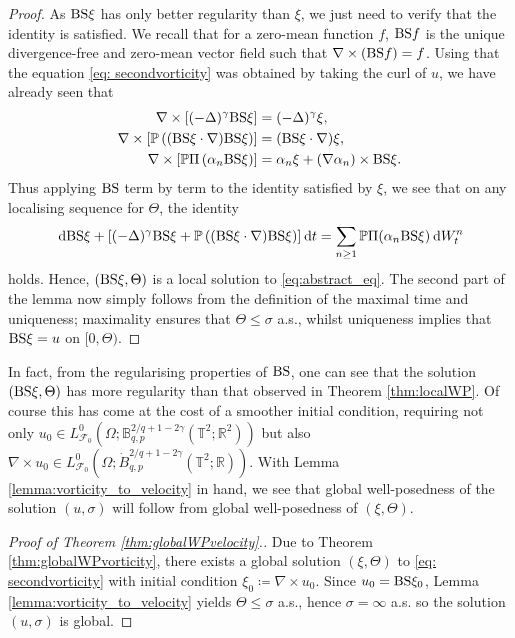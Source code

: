 \documentclass[11pt, a4paper,oneside, reqno]{amsart}
\theoremstyle{remark} %
\theoremstyle{definition} %
\numberwithin{theorem}{section}
\numberwithin{equation}{section}
\def\R{{\mathbb R}}
\renewcommand{\P}{{\mathbb P}}
\newcommand{\Om}{\Omega}
\newcommand{\BS}{{\rm BS}}
\newcommand{\T}{\mathbb{T}}
\newcommand{\mc}{\mathcal}
\newcommand{\RR}{\mathbb{R}}
\newcommand{\BB}{\mathbb{B}}
\newcommand{\del}{\Delta}
\newcommand{\grad}{\nabla}
\newcommand{\gam}{\gamma}
\newcommand{\dd}{\hspace{2pt}\mathrm{d}}
\begin{document}
\begin{proof}
    As $\BS\xi$ has only better regularity than $\xi$, we just need to verify that the identity is satisfied. We recall that for a zero-mean function $f$, $\BS f$ is the unique divergence-free and zero-mean vector field such that $\nabla \times (\BS f) = f$. Using that the equation \eqref{eq: secondvorticity} was obtained by taking the curl of $u$, we have already seen that
    \begin{align*}
        \nabla \times \left[(-\del)^\gam \BS\xi \right] &= (-\del)^\gam \xi,\\
        \nabla \times \left[\P \left((\BS\xi \cdot \grad)\BS\xi \right)\right] &= (\BS\xi \cdot \grad)\xi,\\
        \nabla \times \left[ \P \Pi \left(\alpha_n \BS\xi\right)\right] &= \alpha_n\xi + (\nabla \alpha_n) \times \BS\xi.
    \end{align*}
   Thus applying $\BS$ term by term to the identity satisfied by $\xi$, we see that on any localising sequence for $\Theta$, the identity
   $$\dd \BS\xi + [(-\del)^\gam \BS\xi+\P\left((\BS\xi\cdot\grad) \BS\xi\right)]\dd t  =\sum_{n\geq 1}\P \Pi(\alpha_n\BS\xi)\dd W^n_t$$
holds. Hence, $(\BS\xi, \Theta)$ is a local solution to \eqref{eq:abstract_eq}. The second part of the lemma now simply follows from the definition of the maximal time and uniqueness; maximality ensures that $\Theta \leq \sigma$ a.s., whilst uniqueness implies that $\BS\xi = u$ on $[0,\Theta)$.
\end{proof}

In fact, from the regularising properties of $\BS$, one can see that the solution $(\BS\xi, \Theta)$ has more regularity than that observed in Theorem \ref{thm:localWP}. Of course this has come at the cost of a smoother initial condition, requiring not only $u_0 \in L^0_{\mc{F}_0}(\Om; \BB_{q,p}^{2/q+1-2\gam}(\T^2;\RR^2))$ but also $\nabla \times u_0 \in L^0_{\mc{F}_0}(\Om; \dot{B}_{q,p}^{2/q+1-2\gam}(\T^2;\R))$. With Lemma \ref{lemma:vorticity_to_velocity} in hand, we see that global well-posedness of the solution $(u,\sigma)$ will follow from global well-posedness of $(\xi,\Theta)$.


\begin{proof}[Proof of Theorem \ref{thm:globalWPvelocity}.]
        Due to Theorem \ref{thm:globalWPvorticity}, there exists a global solution $(\xi,\Theta)$ to \eqref{eq: secondvorticity} with initial condition $\xi_0 \coloneqq \nabla \times u_0.$ Since $u_0 = \BS\xi_0$, Lemma \ref{lemma:vorticity_to_velocity} yields $\Theta \leq \sigma$ a.s., hence $\sigma = \infty$ a.s. so the solution $(u,\sigma)$ is global.
\end{proof}




\end{document}
